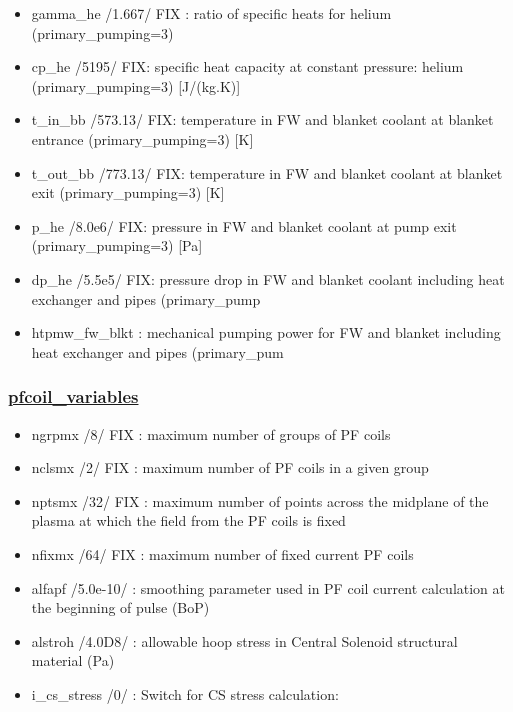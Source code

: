 \documentclass[]{article}
\providecommand{\tightlist}{%
  \setlength{\itemsep}{0pt}\setlength{\parskip}{0pt}}
\begin{document}
\begin{itemize}
  \begin{itemize}
  \tightlist
  \item
    gamma\_he /1.667/ FIX : ratio of specific heats for helium
    (primary\_pumping=3)
  \item
    cp\_he /5195/ FIX: specific heat capacity at constant pressure:
    helium (primary\_pumping=3) {[}J/(kg.K){]}
  \item
    t\_in\_bb /573.13/ FIX: temperature in FW and blanket coolant at
    blanket entrance (primary\_pumping=3) {[}K{]}
  \item
    t\_out\_bb /773.13/ FIX: temperature in FW and blanket coolant at
    blanket exit (primary\_pumping=3) {[}K{]}
  \item
    p\_he /8.0e6/ FIX: pressure in FW and blanket coolant at pump exit
    (primary\_pumping=3) {[}Pa{]}
  \item
    dp\_he /5.5e5/ FIX: pressure drop in FW and blanket coolant
    including heat exchanger and pipes (primary\_pump
  \item
    htpmw\_fw\_blkt : mechanical pumping power for FW and blanket
    including heat exchanger and pipes (primary\_pum
  \end{itemize}

  \subsubsection{\texorpdfstring{\href{pfcoil_variables.html}{pfcoil\_variables}}{pfcoil\_variables}}\label{pfcoil_variables}

  \begin{itemize}
  \tightlist
  \item
    ngrpmx /8/ FIX : maximum number of groups of PF coils
  \item
    nclsmx /2/ FIX : maximum number of PF coils in a given group
  \item
    nptsmx /32/ FIX : maximum number of points across the midplane of
    the plasma at which the field from the PF coils is fixed
  \item
    nfixmx /64/ FIX : maximum number of fixed current PF coils
  \item
    alfapf /5.0e-10/ : smoothing parameter used in PF coil current
    calculation at the beginning of pulse (BoP)
  \item
    alstroh /4.0D8/ : allowable hoop stress in Central Solenoid
    structural material (Pa)
  \item
    i\_cs\_stress /0/ : Switch for CS stress calculation:


\end{itemize}
\end{itemize}
\end{document}
